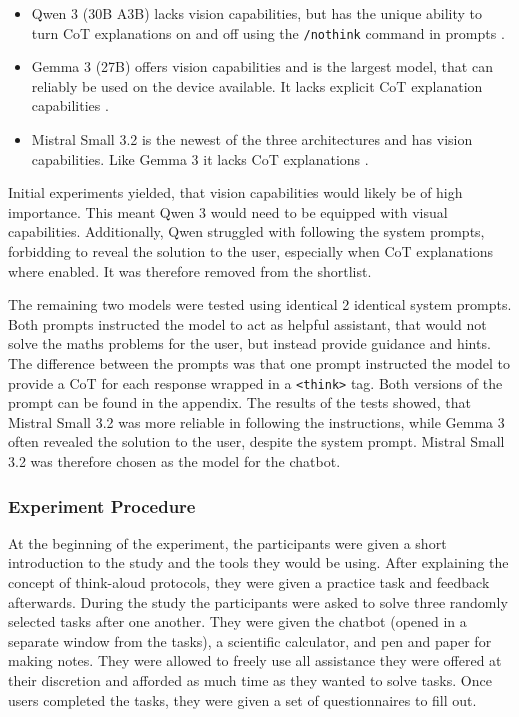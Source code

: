 \begin{itemize}
    \item Qwen 3 (30B A3B) lacks vision capabilities, but has the unique ability to turn \ac{CoT} explanations on and off using the \texttt{/nothink} command in prompts \parencite{Qwen2025}.

    \item Gemma 3 (27B) offers vision capabilities and is the largest model, that can reliably be used on the device available. It lacks explicit \ac{CoT} explanation capabilities \parencite{GemmaTeam2025}.

    \item Mistral Small 3.2 is the newest of the three architectures and has vision capabilities. Like Gemma 3 it lacks \ac{CoT} explanations \parencite{Mistral2025}.
\end{itemize}

Initial experiments yielded, that vision capabilities would likely be of high importance. This meant Qwen 3 would need to be equipped with visual capabilities. Additionally, Qwen struggled with following the system prompts, forbidding to reveal the solution to the user, especially when \ac{CoT} explanations where enabled. It was therefore removed from the shortlist.

The remaining two models were tested using identical 2 identical system prompts. Both prompts instructed the model to act as helpful assistant, that would not solve the maths problems for the user, but instead provide guidance and hints. The difference between the prompts was that one prompt instructed the model to provide a \ac{CoT} for each response wrapped in a \texttt{<think>} tag. Both versions of the prompt can be found in the appendix. The results of the tests showed, that Mistral Small 3.2 was more reliable in following the instructions, while Gemma 3 often revealed the solution to the user, despite the system prompt. Mistral Small 3.2 was therefore chosen as the model for the chatbot.

\subsubsection{Experiment Procedure} \label{sssec:experiment_procedure}

At the beginning of the experiment, the participants were given a short introduction to the study and the tools they would be using. After explaining the concept of think-aloud protocols, they were given a practice task and feedback afterwards. During the study the participants were asked to solve three randomly selected tasks after one another. They were given the chatbot (opened in a separate window from the tasks), a scientific calculator, and pen and paper for making notes. They were allowed to freely use all assistance they were offered at their discretion and afforded as much time as they wanted to solve tasks. Once users completed the tasks, they were given a set of questionnaires to fill out.

